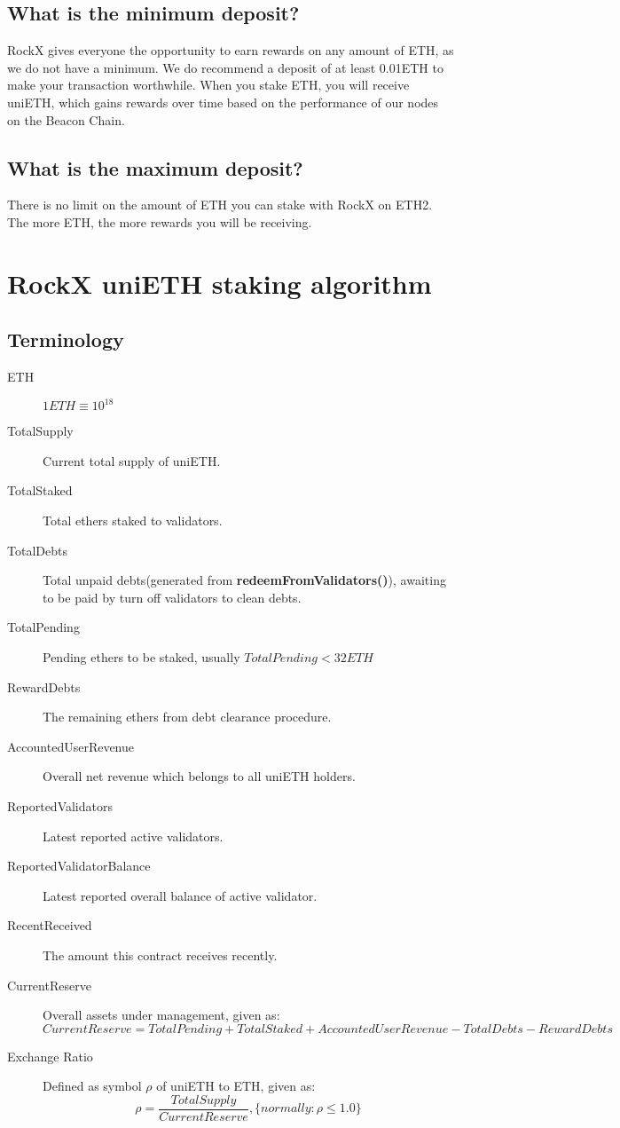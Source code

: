 \documentclass{article}
\begin{document}
\subsection{What is the minimum deposit?}
RockX gives everyone the opportunity to earn rewards on any amount of ETH, as we do not have a minimum. We do recommend a deposit of at least 0.01ETH to make your transaction worthwhile. When you stake ETH, you will receive uniETH, which gains rewards over time based on the performance of our nodes on the Beacon Chain.

\subsection{What is the maximum deposit?}
There is no limit on the amount of ETH you can stake with RockX on ETH2. The more ETH, the more rewards you will be receiving.

\section{RockX uniETH staking algorithm}

\subsection{Terminology}
\begin{description}
   \item[ETH] $1 ETH \equiv 10^{18}$
   \item[TotalSupply] Current total supply of uniETH.
   \item[TotalStaked] Total ethers staked to validators.
   \item[TotalDebts] Total unpaid debts(generated from \textbf{redeemFromValidators()}), awaiting to be paid by turn off validators to clean debts.
   \item[TotalPending] Pending ethers to be staked, usually $TotalPending <32ETH$
   \item[RewardDebts] The remaining ethers from debt clearance procedure.
   \item[AccountedUserRevenue] Overall net revenue which belongs to all uniETH holders.
   \item[ReportedValidators] Latest reported active validators.
   \item[ReportedValidatorBalance] Latest reported overall balance of active validator.
   \item[RecentReceived] The amount this contract receives recently.
   \item[CurrentReserve] Overall assets under management, given as:
   \[CurrentReserve = TotalPending + TotalStaked + AccountedUserRevenue - TotalDebts - RewardDebts\]
   \item[Exchange Ratio] Defined as symbol $\rho$ of uniETH to ETH, given as: 
    \[\rho = \frac{TotalSupply}{CurrentReserve} , \{normally: \rho \leq 1.0\} \]
\end{description}
\end{document}

